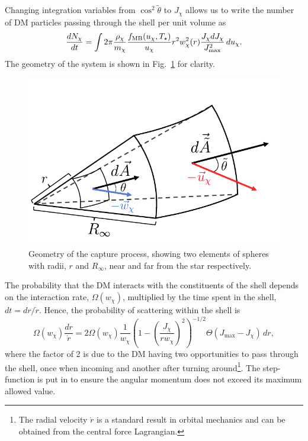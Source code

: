 Changing integration variables from $\cos^2\tilde \theta$ to $J_\chi$ allows us to write the number of DM particles passing through the shell per unit volume as
\begin{equation}
    \frac{dN_\chi}{dt} = \int 2\pi \frac{\rho_\chi}{m_\chi} \frac{f_{\rm MB}(u_\chi, T_\star)}{u_\chi} r^2 w_\chi^2(r) \frac{J_\chi dJ_\chi}{J^2_\mathrm{max}}\,du_\chi.\label{ch3:eq:shell_flux}
\end{equation}
The geometry of the system is shown in Fig.~\ref{ch3:fig:capturegeometry} for clarity.

\begin{figure}
    \centering
    \includegraphics{capture_geometry.pdf}
    \caption{Geometry of the capture process, showing two elements of spheres with radii, $r$ and $R_\infty$, near and far from the star respectively.}
    \label{ch3:fig:capturegeometry}
\end{figure}

The probability that the DM interacts with the constituents of the shell depends on the interaction rate, $\Omega(w_\chi)$, multiplied by the time spent in the shell, $dt = dr/\dot r$. Hence, the probability of scattering within the shell is
\begin{equation}
    \Omega(w_\chi) \frac{dr}{\dot r} = 2  \Omega(w_\chi)\frac{1}{w_\chi}\left(1 - \left(\frac{J_\chi}{r w_\chi}\right)^2 \right)^{-1/2} \Theta(J_{\mathrm{max}} - J_\chi)\,dr,\label{ch3:eq:int_prob_1}
\end{equation}
where the factor of 2 is due to the DM having two opportunities to pass through the shell, once when incoming and another after turning around\footnote{The radial velocity $\dot r$ is a standard result in orbital mechanics and can be obtained from the central force Lagrangian.}. The step-function is put in to ensure the angular momentum does not exceed its maximum allowed value. 

